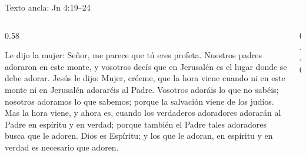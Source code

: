 \begin{frame}{Texto ancla: Jn 4:19--24}
\begin{columns}[c,onlytextwidth]
\begin{column}{0.58\textwidth}
\begin{cita}[fontupper=\scriptsize\itshape]Le dijo la mujer: Señor, me parece que tú eres profeta. Nuestros padres adoraron en este monte, y vosotros decís que en Jerusalén es el lugar donde se debe adorar. Jesús le dijo: Mujer, créeme, que la hora viene cuando ni en este monte ni en Jerusalén adoraréis al Padre. Vosotros adoráis lo que no sabéis; nosotros adoramos lo que sabemos; porque la salvación viene de los judíos. Mas la hora viene, y ahora es, cuando los verdaderos adoradores adorarán al Padre en espíritu y en verdad; porque también el Padre tales adoradores busca que le adoren. Dios es Espíritu; y los que le adoran, en espíritu y en verdad es necesario que adoren.\end{cita}
\end{column}
\begin{column}{0.40\textwidth}\end{column}
\end{columns}
\end{frame}

